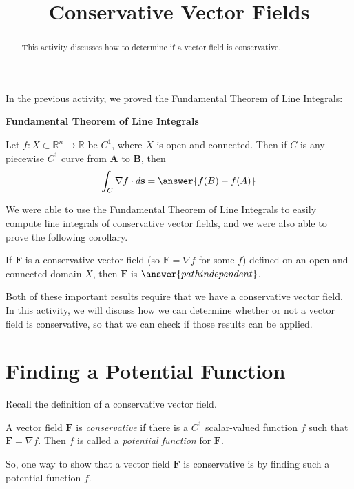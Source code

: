 \documentclass{ximera}
\title{Conservative Vector Fields}
\begin{document}
  
\begin{abstract}  
This activity discusses how to determine if a vector field is conservative.
\end{abstract}  
\maketitle  

In the previous activity, we proved the Fundamental Theorem of Line Integrals:

\begin{theorem}
\textbf{Fundamental Theorem of Line Integrals}

Let $f:X\subset \mathbb{R}^n\rightarrow \mathbb{R}$ be $C^1$, where $X$ is open and connected. Then if $C$ is any piecewise $C^1$ curve from $\textbf{A}$ to $\textbf{B}$, then
\[
\int_C\nabla f\cdot d\textbf{s} = \answer{f(B)-f(A)}
\]
\end{theorem}

We were able to use the Fundamental Theorem of Line Integrals to easily compute line integrals of conservative vector fields, and we were also able to prove the following corollary.

\begin{corollary}
If $\textbf{F}$ is a conservative vector field (so $\textbf{F}=\nabla f$ for some $f$) defined on an open and connected domain $X$, then $\textbf{F}$ is $\answer{path independent}$.
\end{corollary}

Both of these important results require that we have a conservative vector field. In this activity, we will discuss how we can determine whether or not a vector field is conservative, so that we can check if those results can be applied.

\section{Finding a Potential Function}

Recall the definition of a conservative vector field.

\begin{definition}
A vector field $\mathbf{F}$ is \emph{conservative} if there is a $C^1$ scalar-valued function $f$ such that $\mathbf{F}=\nabla f$. Then $f$ is called a \emph{potential function} for $\mathbf{F}$.
\end{definition}

So, one way to show that a vector field $\mathbf{F}$ is conservative is by finding such a potential function $f$.
\end{document}

